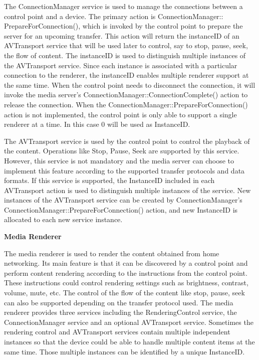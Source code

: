 The ConnectionManager service is used to manage the connections between a 
control point and a device. The primary action is 
ConnectionManager:: PrepareForConnection(), which is invoked by the control 
point to prepare the server for an upcoming transfer. This 
action will return the instanceID of an AVTransport service that will be used 
later to control, say to stop, pause, seek, the flow of content. The instanceID is used to distinguish multiple instances of the AVTransport service. Since each instance is associated with a particular connection to the renderer, the instanceID enables multiple renderer support at the same time. When the 
control point needs to disconnect the connection, it will invoke the media 
server's ConnectionManager::ConnectionComplete() action to release the 
connection. When the ConnectionManager::PrepareForConnection() action is not 
implemented, the control point is only able to support a single renderer at a 
time. In this case 0 will be used as InstanceID. 

The AVTransport service is used by the control point to control the playback of the 
content. Operations like Stop, Pause, Seek are supported by this service. However, this 
service is not mandatory and the media server can choose to implement this feature 
according to the supported transfer protocols and data formats. If this service 
is supported, the InstanceID included in each AVTransport action is used to 
distinguish multiple instances of the service. New instances of the AVTransport 
service can be created by ConnectionManager's 
ConnectionManager::PrepareForConnection() action, and new InstanceID is 
allocated to each new service instance. 

\textbf{Media Renderer} 

The media renderer is used to render the content obtained from home 
networking. Its main feature is that it can be discovered by a control point and perform content rendering according to the instructions from the control point. These instructions could control rendering settings such as brightness, contrast, volume, mute, etc. The control of the flow of the content like stop, pause, seek can also be supported depending on the transfer protocol used. The media 
renderer provides three services including the RenderingControl service, the ConnectionManager 
service and an optional AVTransport service. Sometimes the rendering control and 
AVTransport services contain multiple independent instances so that the device 
could be able to handle multiple content items at the same time. Those multiple 
instances can be identified by a unique InstanceID.


